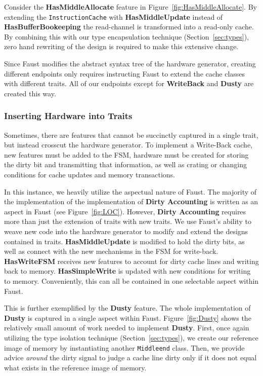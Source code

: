 \documentclass[conference]{IEEEtran}
\begin{document}
Consider the \textbf{HasMiddleAllocate} feature in Figure~\ref{fig:HasMiddleAllocate}. By extending the \texttt{InstructionCache} with \textbf{HasMiddleUpdate} instead of \textbf{HasBufferBookeeping} the read-channel is transformed into a read-only cache. By combining this with our type encapsulation technique (Section~\ref{sec:types}), zero hand rewriting of the design is required to make this extensive change.

Since Faust modifies the abstract syntax tree of the hardware generator, creating different endpoints only requires instructing Faust to extend the cache classes with different traits. All of our endpoints except for \textbf{WriteBack} and \textbf{Dusty} are created this way.

\subsubsection{Inserting Hardware into Traits}
Sometimes, there are features that cannot be succinctly captured in a single trait, but instead crosscut the hardware generator. To implement a Write-Back cache, new features must be added to the FSM, hardware must be created for storing the dirty bit and transmitting that information, as well as crating or changing conditions for cache updates and memory transactions. 

In this instance, we heavily utilize the aspectual nature of Faust. The majority of the implementation of the implementation of \textbf{Dirty Accounting} is written as an aspect in Faust (see Figure~\ref{fig:LOC}). However, \textbf{Dirty Accounting} requires more than just the extension of traits with new traits. We use Faust's ability to weave new code into the hardware generator to modify and extend the designs contained in traits. \textbf{HasMiddleUpdate} is modified to hold the dirty bits, as well as connect with the new mechanisms in the FSM for write-back. \textbf{HasWriteFSM} receives new features to account for dirty cache lines and writing back to memory. \textbf{HasSimpleWrite} is updated with new conditions for writing to memory. Conveniently, this can all be contained in one selectable aspect within Faust.

This is further exemplified by the \textbf{Dusty} feature. The whole implementation of \textbf{Dusty} is captured in a single aspect within Faust. Figure~\ref{fig:Dusty} shows the relatively small amount of work needed to implement \textbf{Dusty}. First, once again utilizing the type isolation technique (Section~\ref{sec:types}), we create our reference image of memory by instantiating another \texttt{Middleend} class. Then, we provide advice \emph{around} the dirty signal to judge a cache line dirty only if it does not equal what exists in the reference image of memory.
\end{document}
